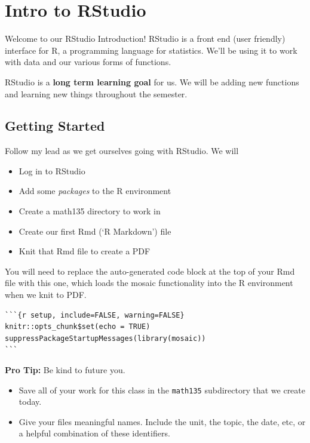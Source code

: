 \documentclass[
]{book}
\providecommand{\tightlist}{%
  \setlength{\itemsep}{0pt}\setlength{\parskip}{0pt}}
\begin{document}
\hypertarget{intro-to-rstudio}{%
\chapter{Intro to RStudio}\label{intro-to-rstudio}}

Welcome to our RStudio Introduction! RStudio is a front end (user friendly) interface for R, a programming
language for statistics. We'll be using it to work with data and our various forms of functions.

RStudio is a \textbf{long term learning goal} for us. We will be adding new functions and learning new
things throughout the semester.

\hypertarget{getting-started}{%
\section{Getting Started}\label{getting-started}}

Follow my lead as we get ourselves going with RStudio. We will

\begin{itemize}
\tightlist
\item
  Log in to RStudio
\item
  Add some \emph{packages} to the R environment
\item
  Create a math135 directory to work in
\item
  Create our first Rmd (`R Markdown') file
\item
  Knit that Rmd file to create a PDF
\end{itemize}

You will need to replace the auto-generated code block at the top of your Rmd file with this one, which loads the mosaic functionality into the R environment when we knit to PDF.

\begin{verbatim}
```{r setup, include=FALSE, warning=FALSE}
knitr::opts_chunk$set(echo = TRUE)
suppressPackageStartupMessages(library(mosaic))
```
\end{verbatim}

\textbf{Pro Tip:} Be kind to future you.

\begin{itemize}
\tightlist
\item
  Save all of your work for this class in the \texttt{math135} subdirectory that we create today.
\item
  Give your files meaningful names. Include the unit, the topic, the date, etc, or a helpful combination of these identifiers.
\end{itemize}
\end{document}

